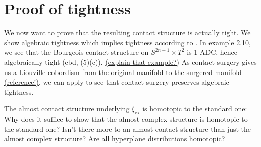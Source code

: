 \section*{Proof of tightness}
We now want to prove that the resulting contact structure is actually tight.
We show algebraic tightness which implies tightness according to \cite[Proposition 3.2 (1)]{BGMZ22}.
In example 2.10, we see that the Bourgeois contact structure on $S^{2n-1} \times T^2$ is 1-ADC, hence algebraically tight (ebd, (5)(c)). 
\underline{(explain that example?)}
As contact surgery gives us a Liouville cobordism from the original manifold to the surgered manifold \underline{(reference!)}, we can apply \cite[Proposition 3.2 (3)]{BGMZ22} to see that contact surgery preserves algebraic tightness.

The almost contact structure underlying $\xi_\mathrm{ex}$ is homotopic to the standard one:
Why does it suffice to show that the almost complex structure is homotopic to the standard one? Isn't there more to an almost contact structure than just the almost complex structure? Are all hyperplane distributions homotopic?